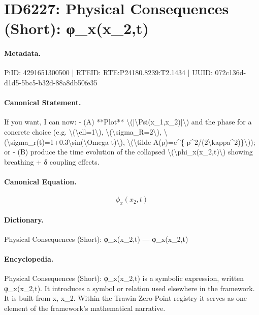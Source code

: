 \section*{ID6227: Physical Consequences (Short): φ\_x(x\_2,t)}
\paragraph{Metadata.}
PiID: 4291651300500 | RTEID: RTE:P24180.8239:T2.1434 | UUID: 072c136d-d1d5-5bc5-b32d-88a8db50fe35

\paragraph{Canonical Statement.}
If you want, I can now: - (A) **Plot** \textbackslash{}(|\textbackslash{}Psi(x\_1,x\_2)|\textbackslash{}) and the phase for a concrete choice (e.g. \textbackslash{}(\textbackslash{}ell=1\textbackslash{}), \textbackslash{}(\textbackslash{}sigma\_R=2\textbackslash{}), \textbackslash{}(\textbackslash{}sigma\_r(t)=1+0.3\textbackslash{}sin(\textbackslash{}Omega t)\textbackslash{}), \textbackslash{}(\textbackslash{}tilde A(p)=e\textasciicircum{}\{-p\textasciicircum{}2/(2\textbackslash{}kappa\textasciicircum{}2)\}\textbackslash{})); or - (B) produce the time evolution of the collapsed \textbackslash{}(\textbackslash{}phi\_x(x\_2,t)\textbackslash{}) showing breathing + δ coupling effects.

\paragraph{Canonical Equation.}
\[
\phi_x(x_2,t)
\]

\paragraph{Dictionary.}
Physical Consequences (Short): φ\_x(x\_2,t) — φ\_x(x\_2,t)

\paragraph{Encyclopedia.}
Physical Consequences (Short): φ\_x(x\_2,t) is a symbolic expression, written φ\_x(x\_2,t). It introduces a symbol or relation used elsewhere in the framework. It is built from x, x\_2. Within the Trawin Zero Point registry it serves as one element of the framework's mathematical narrative.

